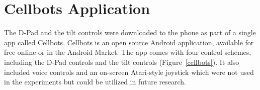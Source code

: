 \documentclass[12pt, letterpaper]{report}
\begin{document}
\section{Cellbots Application}
The D-Pad and the tilt controls were downloaded to the phone as part of a single app called Cellbots. Cellbots is an open source Android application, available for free online or in the Android Market. The app comes with four control schemes, including the D-Pad controls and the tilt controls (Figure~\ref{cellbots}). It also included voice controls and an on-screen Atari-style joystick which were not used in the experiments but could be utilized in future research.

\begin{figure}
	\centering

\end{figure}
\end{document}
